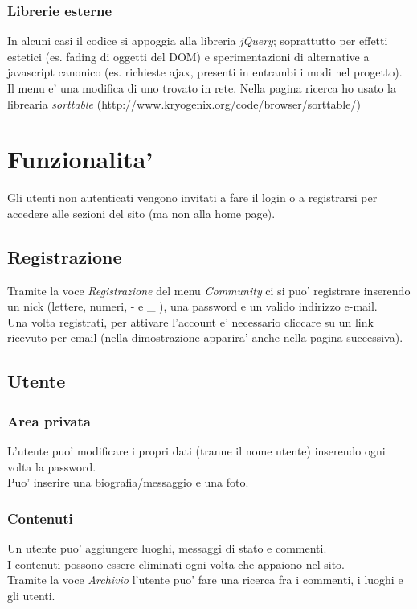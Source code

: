 \documentclass{article}
\begin{document}
\subsubsection{Librerie esterne}
In alcuni casi il codice si appoggia alla libreria \emph{jQuery}; soprattutto per effetti estetici (es. fading di oggetti del DOM) e sperimentazioni di alternative a javascript canonico (es. richieste ajax, presenti in entrambi i modi nel progetto).
\\
Il menu e' una modifica di uno trovato in rete. Nella pagina ricerca ho usato la librearia \emph{sorttable} (\small{http://www.kryogenix.org/code/browser/sorttable/})



\section{Funzionalita'}

Gli utenti non autenticati vengono invitati a fare il login o a registrarsi per accedere alle sezioni del sito (ma non alla home page).

\subsection{Registrazione}

Tramite la voce \emph{Registrazione} del menu \emph{Community} ci si puo' registrare inserendo un nick (lettere, numeri, - e \_ ), una password e un valido indirizzo e-mail.
\\
Una volta registrati, per attivare l'account e' necessario cliccare su un link ricevuto per email (nella dimostrazione apparira' anche nella pagina successiva).

\subsection{Utente}
\subsubsection{Area privata}
L'utente puo' modificare i propri dati (tranne il nome utente) inserendo ogni volta la password.\\
Puo' inserire una biografia/messaggio e una foto.
\subsubsection{Contenuti}
Un utente puo' aggiungere luoghi, messaggi di stato e commenti.\\
I contenuti possono essere eliminati ogni volta che appaiono nel sito.\\
Tramite la voce \emph{Archivio} l'utente puo' fare una ricerca fra i commenti, i luoghi e gli utenti.\\
\end{document}
